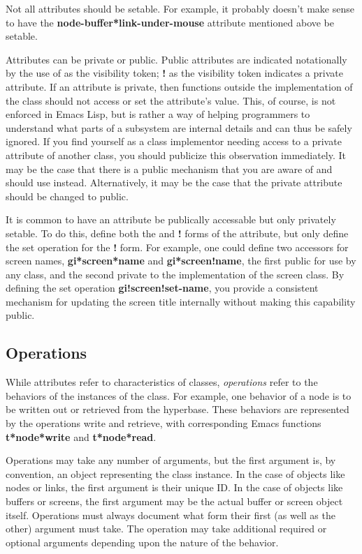 Not all attributes should be setable.  For example, it probably
doesn't make sense to have the {\bf node-buffer*link-under-mouse}
attribute mentioned above be setable.

Attributes can be private or public.  Public attributes are indicated
notationally by the use of {\bf *} as the visibility token; {\bf !} as
the visibility token indicates a private attribute.  If an attribute is
private, then functions outside the implementation of the class should
not access or set the attribute's value.  This, of course, is not
enforced in Emacs Lisp, but is rather a way of helping programmers to 
understand what parts of a subsystem are internal details and can thus
be safely ignored.  If you find yourself as a class implementor needing 
access to a private attribute of another class, you should publicize this
observation immediately.  It may be the case that there is a public mechanism
that you are aware of and should use instead.  Alternatively, it may be
the case that the private attribute should be changed to public.

It is common to have an attribute be publically accessable but only
privately setable.  To do this, define both the {\bf *} and {\bf !}
forms of the attribute, but only define the set operation for the {\bf
!} form. For example, one could define two accessors for screen names,
{\bf gi*screen*name} and {\bf gi*screen!name}, the first public for use
by any class, and the second private to the implementation of the
screen class.  By defining the set operation {\bf gi!screen!set-name},
you provide a consistent mechanism for updating the screen title
internally without making this capability public.

\subsection{Operations}

While attributes refer to characteristics of classes, {\em operations}
refer to the behaviors of the instances of the class.  For example,
one behavior of a node is to be written out or retrieved from the
hyperbase.  These behaviors are represented by the operations
{\sf write} and {\sf retrieve}, with corresponding Emacs functions {\bf
t*node*write} and {\bf t*node*read}.

Operations may take any number of arguments, but the first argument
is, by convention, an object representing the class instance.  In the
case of objects like nodes or links, the first argument is their
unique ID.  In the case of objects like buffers or screens, the first
argument may be the actual buffer or screen object itself.  Operations
must always document what form their first (as well as the other)
argument must take. The operation may take additional required or
optional arguments depending upon the nature of the behavior.


